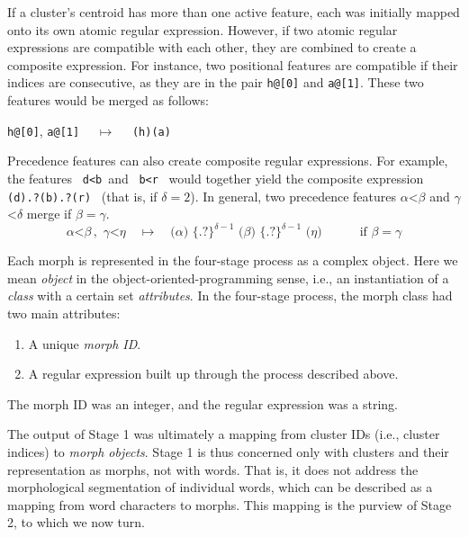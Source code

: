 {If a cluster's centroid has more than one active feature, each
was initially mapped onto its own atomic regular expression.
However, if two atomic regular expressions are compatible with each other, 
they are combined to create a composite expression. For instance, two 
positional features are compatible if their indices are consecutive, 
as they are in the pair \texttt{h@[0]} and \texttt{a@[1]}. These two features would be
merged as follows:
\begin{center}
\texttt{h@[0]}, \texttt{a@[1]} $\quad \mapsto \quad$ \texttt{(h)(a)}
\end{center}
Precedence features 
can also create composite regular expressions. For example, the 
features \, \texttt{d<b}\,  and \, \texttt{b<r} \, would together yield the 
composite expression \, \texttt{(d).?(b).?(r)} \, (that is, if $\delta = 2$). 
In general, two precedence features $\alpha$<$\beta$ and $\gamma$<$\delta$
merge if $\beta=\gamma$.
\begin{equation}
\alpha\texttt{<} \beta \, ,\,\, \gamma \texttt{<} \eta  \quad \mapsto \quad \texttt{(} \alpha \texttt{)}  \,\, 
{\{\texttt{.?}\}}^{\delta-1} \,\, \texttt{(}\beta \texttt{)} \,\,{\{\texttt{.?}\}}^{\delta-1} \, \, \texttt{(} \eta \texttt{)} \qquad \quad \text{if $\beta = \gamma$} 
\end{equation}

Each morph is represented in the four-stage process as a complex object. Here 
we mean \emph{object} in the object-oriented-programming sense, i.e., an instantiation of a \emph{class} with a certain set \emph{attributes}.
In the four-stage process, the morph class had two main attributes:
\begin{enumerate}
\item A unique \emph{morph ID}.
\item A regular expression built up through the process described above.
\end{enumerate}
The morph ID was an integer, and the regular expression was a string.

The output of Stage 1 was ultimately a mapping from cluster IDs (i.e., cluster indices) to \emph{morph objects}.
Stage 1 is thus concerned only with clusters and their representation as morphs, not with words. That is,
it does not address the morphological segmentation of individual words, which can
be described as a mapping from word characters to morphs. This mapping is the purview of Stage 2,
to which we now turn.

}
